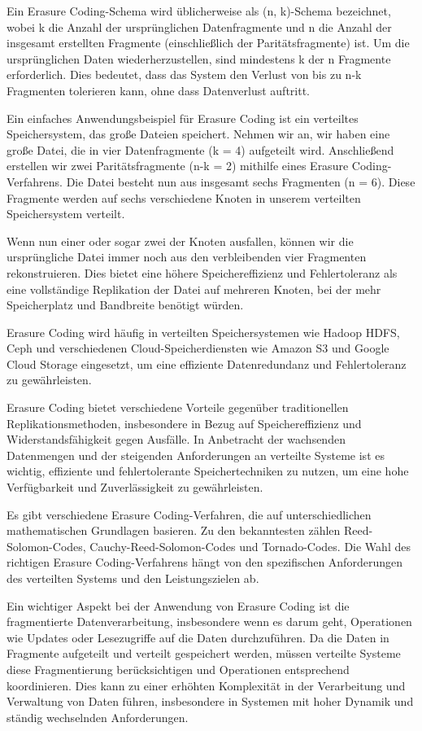 Ein Erasure Coding-Schema wird üblicherweise als (n, k)-Schema bezeichnet, wobei k die Anzahl der ursprünglichen Datenfragmente und n die Anzahl der insgesamt erstellten Fragmente (einschließlich der Paritätsfragmente) ist. Um die ursprünglichen Daten wiederherzustellen, sind mindestens k der n Fragmente erforderlich. Dies bedeutet, dass das System den Verlust von bis zu n-k Fragmenten tolerieren kann, ohne dass Datenverlust auftritt.

Ein einfaches Anwendungsbeispiel für Erasure Coding ist ein verteiltes Speichersystem, das große Dateien speichert. Nehmen wir an, wir haben eine große Datei, die in vier Datenfragmente (k = 4) aufgeteilt wird. Anschließend erstellen wir zwei Paritätsfragmente (n-k = 2) mithilfe eines Erasure Coding-Verfahrens. Die Datei besteht nun aus insgesamt sechs Fragmenten (n = 6). Diese Fragmente werden auf sechs verschiedene Knoten in unserem verteilten Speichersystem verteilt.

Wenn nun einer oder sogar zwei der Knoten ausfallen, können wir die ursprüngliche Datei immer noch aus den verbleibenden vier Fragmenten rekonstruieren. Dies bietet eine höhere Speichereffizienz und Fehlertoleranz als eine vollständige Replikation der Datei auf mehreren Knoten, bei der mehr Speicherplatz und Bandbreite benötigt würden.

Erasure Coding wird häufig in verteilten Speichersystemen wie Hadoop HDFS, Ceph und verschiedenen Cloud-Speicherdiensten wie Amazon S3 und Google Cloud Storage eingesetzt, um eine effiziente Datenredundanz und Fehlertoleranz zu gewährleisten.

Erasure Coding bietet verschiedene Vorteile gegenüber traditionellen Replikationsmethoden, insbesondere in Bezug auf Speichereffizienz und Widerstandsfähigkeit gegen Ausfälle. In Anbetracht der wachsenden Datenmengen und der steigenden Anforderungen an verteilte Systeme ist es wichtig, effiziente und fehlertolerante Speichertechniken zu nutzen, um eine hohe Verfügbarkeit und Zuverlässigkeit zu gewährleisten.

Es gibt verschiedene Erasure Coding-Verfahren, die auf unterschiedlichen mathematischen Grundlagen basieren. Zu den bekanntesten zählen Reed-Solomon-Codes, Cauchy-Reed-Solomon-Codes und Tornado-Codes. Die Wahl des richtigen Erasure Coding-Verfahrens hängt von den spezifischen Anforderungen des verteilten Systems und den Leistungszielen ab.

Ein wichtiger Aspekt bei der Anwendung von Erasure Coding ist die fragmentierte Datenverarbeitung, insbesondere wenn es darum geht, Operationen wie Updates oder Lesezugriffe auf die Daten durchzuführen. Da die Daten in Fragmente aufgeteilt und verteilt gespeichert werden, müssen verteilte Systeme diese Fragmentierung berücksichtigen und Operationen entsprechend koordinieren. Dies kann zu einer erhöhten Komplexität in der Verarbeitung und Verwaltung von Daten führen, insbesondere in Systemen mit hoher Dynamik und ständig wechselnden Anforderungen.

